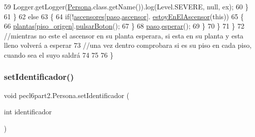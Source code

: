 \begin{DoxyCode}
59                         Logger.getLogger(\mbox{\hyperlink{classpecl6part1_1_1_persona}{Persona}}.class.getName()).log(Level.SEVERE, null, ex);
60                     \}
61                 \}
62                 \textcolor{keywordflow}{else}
63                 \{
64                     \textcolor{keywordflow}{if}(!\mbox{\hyperlink{classpecl6part2_1_1_persona_a3e0fca0322fb911f7fb38ad78b46b70f}{ascensores}}[\mbox{\hyperlink{classpecl6part2_1_1_persona_aa2db1862ae911bee400535c215f5740a}{paso}}.\mbox{\hyperlink{classpecl6part2_1_1_monitor_abfc1bfd2de962ac64f1c505d9dbe136a}{ascensor}}].
      \mbox{\hyperlink{classpecl6part2_1_1_ascensor_a0ec994e509b6cddd706e1f6ee613d6f8}{estoyEnElAscensor}}(\textcolor{keyword}{this}))
65                     \{
66                     \mbox{\hyperlink{classpecl6part2_1_1_persona_a8c92dc1ec730569cae9d9e4f7f04f6fc}{plantas}}[\mbox{\hyperlink{classpecl6part2_1_1_persona_a64acff116f7c56e347369ec54c9109ad}{piso\_origen}}].\mbox{\hyperlink{classpecl6part2_1_1_planta_a09569038a4c6626b58213853f0c58f06}{pulsarBoton}}();
67                     \}
68                     \mbox{\hyperlink{classpecl6part2_1_1_persona_aa2db1862ae911bee400535c215f5740a}{paso}}.\mbox{\hyperlink{classpecl6part2_1_1_monitor_aaf66683271f65268b7d18799972819e0}{esperar}}();
69                 \}
70             \}
71         \}
72         \textcolor{comment}{//mientras no este el ascensor en su planta esperara, si esta en su planta y esta lleno volverá a
       esperar}
73         \textcolor{comment}{//una vez dentro comprobara si es su piso en cada piso, cuando sea el suyo saldrá}
74         
75         
76     \}
\end{DoxyCode}
\mbox{\label{classpecl6part2_1_1_persona_a956943876e65847cb04205997981c799}} 
\subsubsection{\texorpdfstring{set\+Identificador()}{setIdentificador()}}
{\footnotesize\ttfamily void pecl6part2.\+Persona.\+set\+Identificador (\begin{DoxyParamCaption}\item[{int}]{identificador }\end{DoxyParamCaption})\hspace{0.3cm}{\ttfamily [inline]}}


